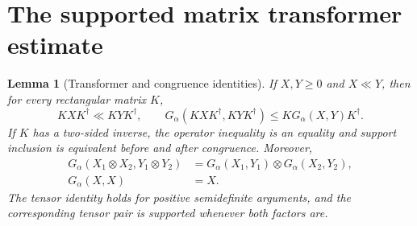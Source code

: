 \documentclass[11pt]{article}
\newcommand{\G}{G_\alpha}
\newtheorem{lemma}[theorem]{Lemma}
\theoremstyle{remark}
\begin{document}
\section{The supported matrix transformer estimate}
\begin{lemma}[Transformer and congruence identities]\label{lem:transform}
If $X,Y\geq0$ and $X\ll Y$, then for every rectangular matrix $K$,
\begin{equation}\label{eq:transform}
 KXK^\dagger\ll KYK^\dagger,
 \qquad \G(KXK^\dagger,KYK^\dagger)\leq K\G(X,Y)K^\dagger.
\end{equation}
If $K$ has a two-sided inverse, the operator inequality is an equality and
support inclusion is equivalent before and after congruence. Moreover,
\begin{align}
 \G(X_1\otimes X_2,Y_1\otimes Y_2)
   &=\G(X_1,Y_1)\otimes\G(X_2,Y_2),\label{eq:tensor}\\
 \G(X,X)&=X.\label{eq:self}
\end{align}
The tensor identity holds for positive semidefinite arguments, and the
corresponding tensor pair is supported whenever both factors are.
\end{lemma}
\end{document}
